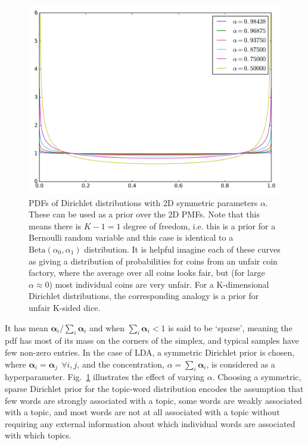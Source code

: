 \begin{figure}
	\centering
	\includegraphics[width=0.65\columnwidth]{figures/beta.png}
	\caption{
		PDFs of Dirichlet distributions with 2D symmetric parameters $\alpha$. These can be used as a prior over the 2D PMFs. Note that this means there is $K-1 = 1$ degree of freedom, i.e. this is a prior for a Bernoulli random variable and this case is identical to a $\mathrm{Beta}(\alpha_0, \alpha_1)$ distribution. It is helpful imagine each of these curves as giving a distribution of probabilities for coins from an unfair coin factory, where the average over all coins looks fair, but (for large $\alpha \approx 0$) most individual coins are very unfair. For a K-dimensional Dirichlet distributions, the corresponding analogy is a prior for unfair K-sided dice.
	}
	\label{fig:beta-pdf}

\end{figure}


It has mean $\boldsymbol{\alpha}_i / \sum_i \boldsymbol{\alpha}_i$ and when $\sum_i \boldsymbol{\alpha}_i < 1$ is said to be `sparse', meaning the pdf has most of its mass on the corners of the simplex, and typical samples have few non-zero entries. In the case of LDA, a symmetric Dirichlet prior is chosen, where $\boldsymbol{\alpha}_i = \boldsymbol{\alpha}_j ~~\forall i, j$, and the concentration, $\alpha = \sum_i \boldsymbol{\alpha}_i$, is considered as a hyperparameter. Fig.~\ref{fig:beta-pdf} illustrates the effect of varying $\alpha$. Choosing a symmetric, sparse Dirichlet prior for the topic-word distribution encodes the assumption that few words are strongly associated with a topic, some words are weakly associated with a topic, and most words are not at all associated with a topic without requiring any external information about which individual words are associated with which topics.

